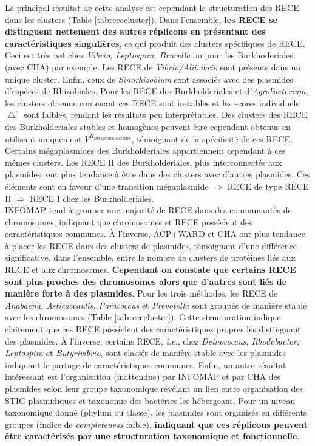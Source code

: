Le principal résultat de cette analyse est cependant la structuration des RECE dans les clusters (Table \ref{tabrececluster}). Dans l'ensemble, {\color{orange}\bf les RECE se distinguent nettement des autres réplicons en présentant des caractéristiques singulières}, ce qui produit des  clusters spécifiques de RECE. Ceci est très net chez \textit{Vibrio, Leptospira, Brucella} ou pour les Burkhoderiales (avec CHA) par exemple. Les RECE de \textit{Vibrio/Aliivibrio}  sont présents dans un unique cluster. Enfin, ceux de \textit{Sinorhizobium} sont associés avec des plasmides d'espèces de Rhizobiales. Pour les RECE des Burkholderiales et d'\textit{Agrobacterium}, les clusters obtenus contenant ces RECE sont instables et les scores individuels $\bigtriangleup^{e}$ sont faibles, rendant les résultats peu interprétables. Des clusters des RECE des Burkholderiales stables et homogènes peuvent être cependant obtenus en utilisant uniquement $V^{R_{\textrm{Betaproteobactéries}}}$, témoignant de la spécificité de ces RECE. Certains mégaplasmides des Burkholderiales appartiennent cependant à ces mêmes clusters. Les RECE II des Burkholderiales, plus interconnectés aux plasmides, ont plus tendance à être dans des clusters avec d'autres plasmides. Ces éléments sont en faveur d'une transition mégaplasmide $\Rightarrow$ RECE de type RECE II $\Rightarrow$ RECE I chez les Burkholderiales.\\
 INFOMAP tend à grouper une majorité de RECE dans des communautés de chromosomes, indiquant que chromosomes et RECE possèdent des caractéristiques communes. À l'inverse, ACP+WARD et CHA ont plus tendance à placer les RECE dans des clusters de plasmides, témoignant d'une différence significative, dans l'ensemble, entre le nombre de clusters de protéines liés aux RECE et aux chromosomes. {\color{orange}\bf Cependant on constate que certains RECE sont plus proches des chromosomes alors que d'autres sont liés de manière forte à des plasmides}.  Pour les trois méthodes, les RECE de \textit{Anabaena, Asticaccaulis, Paracoccus} et \textit{Prevotella} sont groupés de manière stable avec les chromosomes (Table \ref{tabrececluster}). Cette structuration indique clairement que ces RECE possèdent des caractéristiques propres les distinguant des plasmides. À l'inverse, certains RECE, \textit{i.e.}, chez \textit{Deinococcus, Rhodobacter, Leptospira} et \textit{Butyrivibrio}, sont classés de manière stable avec les plasmides indiquant le partage de caractéristiques communes. Enfin, un autre résultat intéressant est l'organisation (inattendue) par INFOMAP et par CHA des plasmides selon leur groupe taxonomique révélant un lien entre organisation des  STIG plasmidiques et taxonomie des bactéries les hébergeant. Pour un niveau taxonomique donné (phylum ou classe), les plasmides sont organisés en différents groupes (indice de \textit{completeness} faible), \textbf{\color{orange} indiquant que ces réplicons peuvent être caractérisés par une structuration taxonomique et fonctionnelle}. \\
